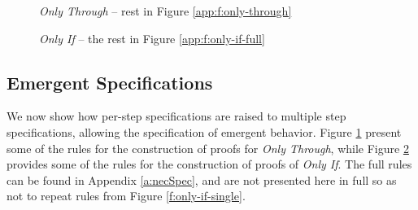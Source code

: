 \begin{figure}[t]
\footnotesize
{}
\caption{ \emph{Only Through} -- rest in Figure \ref{app:f:only-through}}
\label{f:only-through}
\end{figure}
\begin{figure}[t]
\footnotesize
{}
\caption{ \emph{Only If} -- the rest in Figure \ref{app:f:only-if-full}}
\label{f:only-if}
\end{figure}





%
\subsection{Emergent \Nec Specifications}
\label{s:emergent-proof}

We now show how per-step \Nec specifications are raised to 
multiple step \Nec specifications, allowing the specification
of emergent behavior. Figure \ref{f:only-through} present some of the rules for the 
construction of proofs for \emph{Only Through}, while Figure \ref{f:only-if}
provides some of the rules for the construction of proofs of \emph{Only If}. 
The full rules can be found in Appendix \ref{a:necSpec}, and are not presented here 
in full so as not to repeat rules from Figure \ref{f:only-if-single}.

